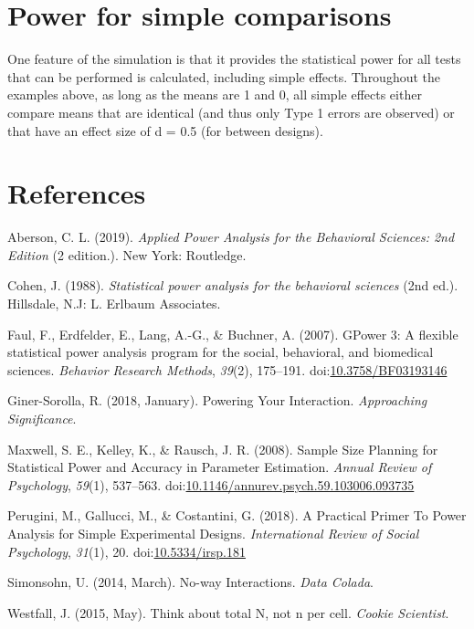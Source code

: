 \documentclass[,man,floatsintext]{apa6}
\begin{document}
\section{Power for simple
comparisons}\label{power-for-simple-comparisons}

One feature of the simulation is that it provides the statistical power
for all tests that can be performed is calculated, including simple
effects. Throughout the examples above, as long as the means are 1 and
0, all simple effects either compare means that are identical (and thus
only Type 1 errors are observed) or that have an effect size of d = 0.5
(for between designs).

\newpage

\section{References}\label{references}

\setlength{\parindent}{-0.5in} \setlength{\leftskip}{0.5in}

\hypertarget{refs}{}
\hypertarget{ref-aberson_applied_2019}{}
Aberson, C. L. (2019). \emph{Applied Power Analysis for the Behavioral
Sciences: 2nd Edition} (2 edition.). New York: Routledge.

\hypertarget{ref-cohen_statistical_1988}{}
Cohen, J. (1988). \emph{Statistical power analysis for the behavioral
sciences} (2nd ed.). Hillsdale, N.J: L. Erlbaum Associates.

\hypertarget{ref-faul_gpower_2007}{}
Faul, F., Erdfelder, E., Lang, A.-G., \& Buchner, A. (2007). GPower 3: A
flexible statistical power analysis program for the social, behavioral,
and biomedical sciences. \emph{Behavior Research Methods}, \emph{39}(2),
175--191.
doi:\href{https://doi.org/10.3758/BF03193146}{10.3758/BF03193146}

\hypertarget{ref-giner-sorolla_powering_2018}{}
Giner-Sorolla, R. (2018, January). Powering Your Interaction.
\emph{Approaching Significance}.

\hypertarget{ref-maxwell_sample_2008}{}
Maxwell, S. E., Kelley, K., \& Rausch, J. R. (2008). Sample Size
Planning for Statistical Power and Accuracy in Parameter Estimation.
\emph{Annual Review of Psychology}, \emph{59}(1), 537--563.
doi:\href{https://doi.org/10.1146/annurev.psych.59.103006.093735}{10.1146/annurev.psych.59.103006.093735}

\hypertarget{ref-perugini_practical_2018}{}
Perugini, M., Gallucci, M., \& Costantini, G. (2018). A Practical Primer
To Power Analysis for Simple Experimental Designs. \emph{International
Review of Social Psychology}, \emph{31}(1), 20.
doi:\href{https://doi.org/10.5334/irsp.181}{10.5334/irsp.181}

\hypertarget{ref-simonsohn_no-way_2014}{}
Simonsohn, U. (2014, March). No-way Interactions. \emph{Data Colada}.

\hypertarget{ref-westfall_think_2015}{}
Westfall, J. (2015, May). Think about total N, not n per cell.
\emph{Cookie Scientist}.
\end{document}
